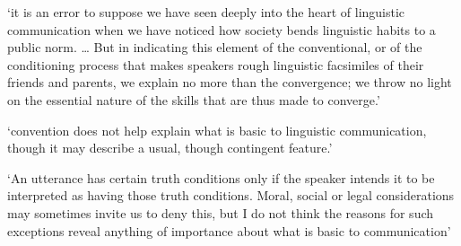 \documentclass[12pt]{extarticle}
\begin{document}
\begin{multicols}{3}
‘it is an error to suppose we have seen deeply into the heart of linguistic communication when we have noticed how society bends linguistic habits to a public norm.
…  But in indicating this element of the conventional, or of the conditioning process that makes speakers rough linguistic facsimiles of their friends and parents, we explain no more than the convergence; we throw no light on the essential nature of the skills that are thus made to converge.’
\citep[p.\ 278]{Davidson:1982uu}
 
‘convention does not help explain what is basic to linguistic communication, though it may describe a usual, though contingent feature.’
\citep[p.\ 280]{Davidson:1982uu}
 
‘An utterance has certain truth conditions only if the speaker intends it to be interpreted as having those truth conditions.
Moral, social or legal considerations may sometimes invite us to deny this, but I do not think the reasons for such exceptions reveal anything of importance about what is basic to communication’
\citep[p.\ 310]{Davidson:1990du}
  
 
\footnotesize 


\end{multicols}
\end{document}
